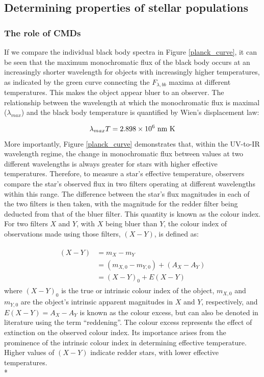 \documentclass[12pt, a4paper]{report}
\begin{document}
\subsection{Determining properties of stellar populations}
\subsubsection{The role of CMDs} \label{CMDs_intro}
If we compare the individual black body spectra in Figure \ref{planck_curve}, it can be seen that the maximum monochromatic flux of the black body occurs at an increasingly shorter wavelength for objects with increasingly higher temperatures, as indicated by the green curve connecting the $F_{\lambda,bb}$ maxima at different temperatures. This makes the object appear bluer to an observer. The relationship between the wavelength at which the monochromatic flux is maximal ($\lambda_{max}$) and the black body temperature is quantified by Wien's displacement law:

\begin{equation}
\lambda_{max} T = 2.898 \times 10^{6} \textnormal{ nm K}
\label{wien_eq}
\end{equation}
More importantly, Figure \ref{planck_curve} demonstrates that, within the UV-to-IR wavelength regime, the change in monochromatic flux between values at two different wavelengths is always greater for stars with higher effective temperatures. Therefore, to measure a star's effective temperature, observers compare the star's observed flux in two filters operating at different wavelengths within this range. The difference between the star's flux magnitudes in each of the two filters is then taken, with the magnitude for the redder filter being deducted from that of the bluer filter. This quantity is known as the colour index. For two filters $X$ and $Y$, with $X$ being bluer than $Y$, the colour index of observations made using those filters, $(X-Y)$, is defined as:

\begin{align}
\begin{split}
(X-Y) &= m_{X} - m_{Y} \\
 &= (m_{X,0} - m_{Y,0}) + (A_{X} - A_{Y}) \\
 &= (X-Y)_{0} + E(X-Y)
\end{split}
\label{colour_index}
\end{align}
where $(X-Y)_{0}$ is the true or intrinsic colour index of the object, $m_{X,0}$ and $m_{Y,0}$ are the object's intrinsic apparent magnitudes in $X$ and $Y$, respectively, and $E(X-Y) = A_{X} - A_{Y}$ is known as the colour excess, but can also be denoted in literature using the term ``reddening''. The colour excess represents the effect of extinction on the observed colour index. Its importance arises from the prominence of the intrinsic colour index in determining effective temperature. Higher values of $(X-Y)$ indicate redder stars, with lower effective temperatures.\\*
\end{document}
